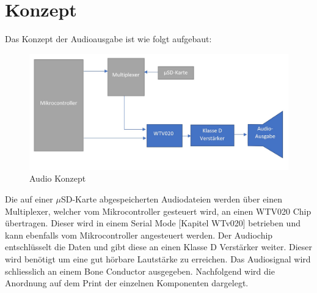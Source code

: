 \section{Konzept}
Das Konzept der Audioausgabe ist wie folgt aufgebaut:
\begin{figure}[h]
	\centering
	\includegraphics[width=15cm]{Bilder/Audio-Konzept.jpg}
	\caption{Audio Konzept}
	\label{Audio-Konzept}
\end{figure}
Die auf einer $\mu$SD-Karte abgespeicherten Audiodateien werden über einen Multiplexer, welcher vom Mikrocontroller gesteuert wird, an einen WTV020 Chip übertragen. Dieser wird in einem Serial Mode [Kapitel WTv020] betrieben und kann ebenfalls vom Mikrocontroller angesteuert werden. Der Audiochip entschlüsselt die Daten und gibt diese an einen Klasse D Verstärker weiter. Dieser wird benötigt um eine gut hörbare Lautstärke zu erreichen. Das Audiosignal wird schliesslich an einem Bone Conductor ausgegeben. 
Nachfolgend wird die Anordnung auf dem Print der einzelnen Komponenten dargelegt. 
